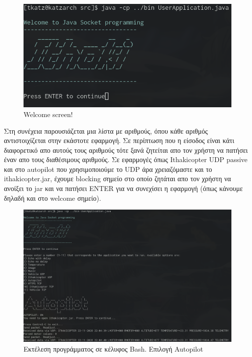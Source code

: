 \documentclass[hidelinks, 12pt, a4paper]{article}
\begin{document}
\begin{figure}[h!]
\centering
	\includegraphics[height=.3\textheight, width=\textwidth]{assets/ui_welcome.png}
	\caption{Welcome screen!} 
    \label{fig:ui}
\end{figure}


Στη συνέχεια παρουσιάζεται μια λίστα με αριθμούς, όπου κάθε αριθμός αντιστοιχίζεται στην εκάστοτε εφαρμογή. Σε περίπτωση που η είσοδος είναι κάτι διαφορετικό απο αυτούς τους αριθμούς τότε ξανά ζητείται απο τον χρήστη να πατήσει έναν απο τους διαθέσιμους αριθμούς. Σε εφαρμογές όπως Ithakicopter UDP passive και στο autopilot που χρησιμοποιούμε το UDP άρα χρειαζόμαστε και το ithakicopter.jar, έχουμε blocking σημείο στο οποίο ζητάται απο τον χρήστη να ανοίξει το jar και να πατήσει ENTER για να συνεχίσει η εφαρμογή (όπως κάνουμε δηλαδή και στο welcome σημείο).

\begin{figure}[h!]
\centering
	\includegraphics[height=.3\textheight, width=\textwidth]{assets/ui.png}
	\caption{Εκτέλεση προγράμματος σε κέλυφος Bash. Επιλογή Autopilot} 
    \label{fig:ui}
\end{figure}
\end{document}
